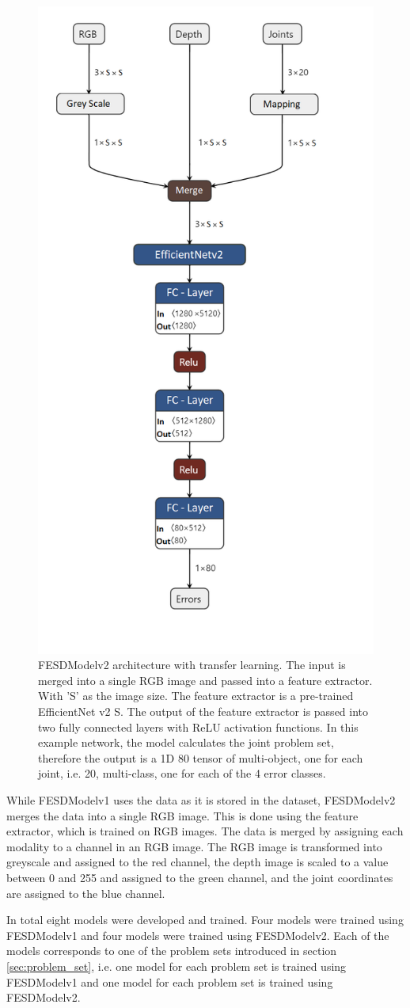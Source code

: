 \begin{figure}[htbp]
  \centering
  \includegraphics[width=.5\linewidth]{figures/Model/FESDv2.png}
  \caption[FESDModel architecture version 2]{FESDModelv2 architecture with transfer learning. The input is merged into a single RGB image and passed into a feature extractor. With 'S' as the image size. The feature extractor is a pre-trained EfficientNet v2 S. The output of the feature extractor is passed into two fully connected layers with ReLU activation functions. In this example network, the model calculates the joint problem set, therefore the output is a 1D 80 tensor of multi-object, one for each joint, i.e. 20, multi-class, one for each of the 4 error classes.}
  \label{fig:model_architecture_v2}
\end{figure}

While FESDModelv1 uses the data as it is stored in the dataset, FESDModelv2 merges the data into a single RGB image. This is done using the feature extractor, which is trained on RGB images. The data is merged by assigning each modality to a channel in an RGB image. The RGB image is transformed into greyscale and assigned to the red channel, the depth image is scaled to a value between 0 and 255 and assigned to the green channel, and the joint coordinates are assigned to the blue channel.

In total eight models were developed and trained. Four models were trained using FESDModelv1 and four models were trained using FESDModelv2. Each of the models corresponds to one of the problem sets introduced in section \ref{sec:problem_set}, i.e. one model for each problem set is trained using FESDModelv1 and one model for each problem set is trained using FESDModelv2.

